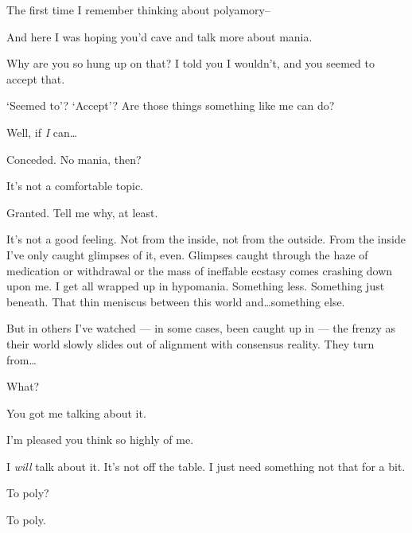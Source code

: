 \noindent The first time I remember thinking about polyamory--

\begin{ally}
And here I was hoping you'd cave and talk more about mania.
\end{ally}
Why are you so hung up on that? I told you I wouldn't, and you seemed to accept that.

\begin{ally}
`Seemed to'? `Accept'? Are those things something like me can do?
\end{ally}
Well, if \emph{I} can\ldots{}

\begin{ally}
Conceded. No mania, then?
\end{ally}
It's not a comfortable topic.

\begin{ally}
Granted. Tell me why, at least.
\end{ally}
It's not a good feeling. Not from the inside, not from the outside. From the inside I've only caught glimpses of it, even. Glimpses caught through the haze of medication or withdrawal or the mass of ineffable ecstasy comes crashing down upon me. I get all wrapped up in hypomania. Something less. Something just beneath. That thin meniscus between this world and\ldots{}something else.

But in others I've watched --- in some cases, been caught up in --- the frenzy as their world slowly slides out of alignment with consensus reality. They turn from\ldots{}

\begin{ally}
What?
\end{ally}
You got me talking about it.

\begin{ally}
I'm pleased you think so highly of me.
\end{ally}
I \emph{will} talk about it. It's not off the table. I just need something not that for a bit.

\begin{ally}
To poly?
\end{ally}
To poly.
\newpage
